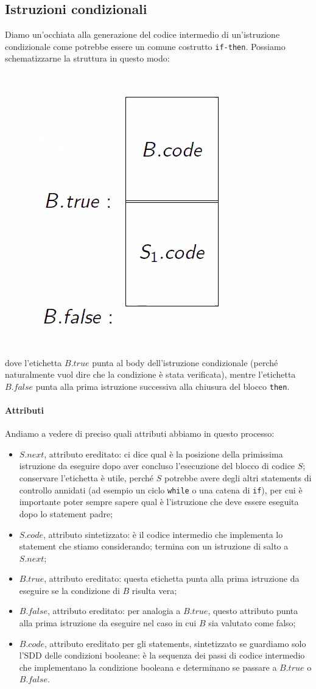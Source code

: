 \documentclass[class=book, crop=false, oneside, 12pt]{standalone}
\begin{document}
\subsection{Istruzioni condizionali}
Diamo un'occhiata alla generazione del codice intermedio di un'istruzione condizionale come potrebbe essere un comune costrutto \texttt{if-then}. Possiamo schematizzarne la struttura in questo modo:
\begin{figure}[H]
    \centering
    \includegraphics[width=.3\textwidth]{if-then-abstract.png}
    \caption{}
\end{figure}
dove l'etichetta \(B.true\) punta al body dell'istruzione condizionale (perché naturalmente vuol dire che la condizione è stata verificata), mentre l'etichetta \(B.false\) punta alla prima istruzione successiva alla chiusura del blocco \texttt{then}.

\paragraph{Attributi}
Andiamo a vedere di preciso quali attributi abbiamo in questo processo:
\begin{itemize}
    \item \(S.next\), attributo ereditato: ci dice qual è la posizione della primissima istruzione da eseguire dopo aver concluso l'esecuzione del blocco di codice \(S\); conservare l'etichetta è utile, perché \(S\) potrebbe avere degli altri statements di controllo annidati (ad esempio un ciclo \texttt{while} o una catena di \texttt{if}), per cui è importante poter sempre sapere qual è l'istruzione che deve essere eseguita dopo lo statement padre;
    \item \(S.code\), attributo sintetizzato: è il codice intermedio che implementa lo statement che stiamo considerando; termina con un istruzione di salto a \(S.next\);
    \item \(B.true\), attributo ereditato: questa etichetta punta alla prima istruzione da eseguire se la condizione di \(B\) risulta vera;
    \item \(B.false\), attributo ereditato: per analogia a \(B.true\), questo attributo punta alla prima istruzione da eseguire nel caso in cui \(B\) sia valutato come falso;
    \item \(B.code\), attributo ereditato per gli statements, sintetizzato se guardiamo solo l'SDD delle condizioni booleane: è la sequenza dei passi di codice intermedio che implementano la condizione booleana e determinano se passare a \(B.true\) o \(B.false\).
\end{itemize}
\end{document}
